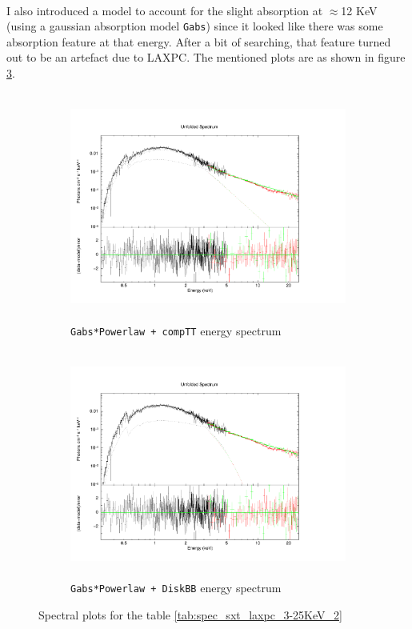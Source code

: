 \documentclass[a4paper,twoside]{report}
\numberwithin{equation}{section}
\begin{document}
\paragraph{}
I also introduced a model to account for the slight absorption at $\approx$12 KeV (using a gaussian absorption model \texttt{Gabs}) since it looked like there was some absorption feature at that energy. After a bit of searching, that feature turned out to be an artefact due to LAXPC. The mentioned plots are as shown in figure \ref{Spec2}.
\begin{figure}[h]
\begin{subfigure}{0.48\textwidth}
\includegraphics[width=1.0\linewidth, height=7.5cm]{tbabs_gabsPl+comptt.pdf}
\caption{\texttt{Gabs*Powerlaw + compTT} energy spectrum}
\label{Spec3}
\end{subfigure}
\begin{subfigure}{0.48\textwidth}
\includegraphics[width=1.0\linewidth, height=7.5cm]{tbabs_gabsPl+diskbb.pdf}
\caption{\texttt{Gabs*Powerlaw + DiskBB} energy spectrum}
\label{Spec4}
\end{subfigure}
\caption{Spectral plots for the table \ref{tab:spec_sxt_laxpc_3-25KeV_2}}
\label{Spec2}
\end{figure}
\end{document}

